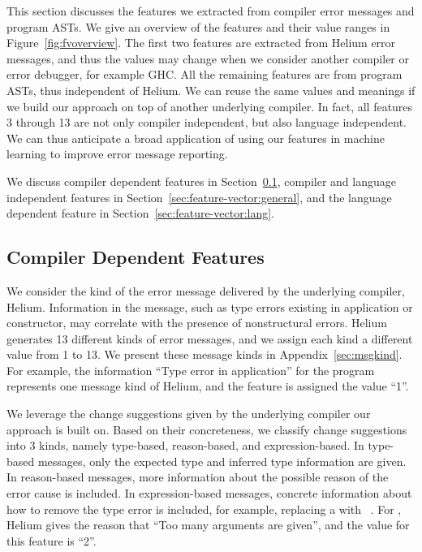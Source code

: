 \documentclass[12pt]{report}	%
\begin{document}
This section discusses the features we extracted
from compiler error messages and program ASTs. 
%
We give an overview of the features and their
value ranges in Figure~\ref{fig:fvoverview}.
%
The first two features are extracted from Helium 
error messages,
and thus the values may change when we consider another
compiler or error debugger, for example GHC. All the remaining
features are from program ASTs, thus independent of Helium.
We can reuse the same values and meanings if we build our
approach on top of another underlying compiler. 
%
In fact, all features 3 through 13
are not only compiler independent, but also language 
independent. 
%
We can thus anticipate a broad application of 
using our features in machine learning to 
improve error message reporting.

We discuss compiler dependent features in Section~\ref{sec:feature-vector:imp}, compiler and
language independent features in 
Section~\ref{sec:feature-vector:general},
and the language dependent feature in 
Section~\ref{sec:feature-vector:lang}. 

\subsection{Compiler Dependent Features}
\label{sec:feature-vector:imp}

%
We consider the kind of the error message delivered
by the underlying compiler, Helium. 
Information in the message,
such as type errors existing in application or constructor,
may correlate with the presence of nonstructural errors.
Helium generates 13 different kinds of error messages,
and we assign each kind a different value from 1 to 13.
We present these message kinds in Appendix~\ref{sec:msgkind}.
For example, the information ``Type error in application'' for 
the program  represents one message kind of Helium,
and the feature is assigned the value ``1''.

%
We leverage the change
suggestions given by the underlying compiler our approach is built on. 
Based on their concreteness, 
we classify change suggestions into 3 kinds,
namely type-based, reason-based, and expression-based.
In type-based messages, only the expected type and
inferred type information are given. 
In reason-based messages, 
more information about the possible reason of the error cause is included.
In expression-based messages, concrete information
about how to remove the type error is included, 
for example, replacing a  
with ~\cite{Hage07:HTE}.
%
For , Helium gives the reason
that ``Too many arguments are given'', and the value
for this feature is ``2''.
\end{document}
